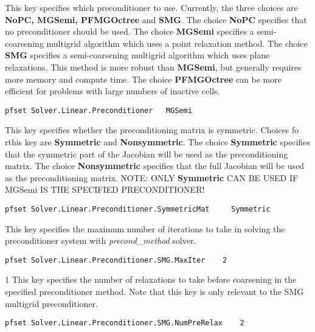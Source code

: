 {This key specifies which preconditioner to use.  Currently, the three choices
are {\bf NoPC, MGSemi, PFMGOctree} and {\bf SMG}.  The choice {\bf NoPC} specifies that no
preconditioner should be used.  The choice {\bf MGSemi} specifies 
a semi-coarsening multigrid algorithm which uses a point relaxation method. 
The choice {\bf SMG} specifies a semi-coarsening multigrid algorithm which uses
plane relaxations.  This method is more robust than {\bf MGSemi}, but generally
requires more memory and compute time. The choice {\bf PFMGOctree} can be more efficient for problems with large numbers of inactive cells.
}
\begin{display}\begin{verbatim}
pfset Solver.Linear.Preconditioner   MGSemi
\end{verbatim}\end{display}


{This key specifies whether the preconditioning matrix is symmetric.
Choices fo rthis key are {\bf Symmetric} and {\bf Nonsymmetric}.
The choice {\bf Symmetric} specifies that the symmetric part of the Jacobian
will be used as the preconditioning matrix.  The choice {\bf Nonsymmetric}
specifies that the full Jacobian will be used as the preconditioning matrix.
NOTE: ONLY {\bf Symmetric} CAN BE USED IF MGSemi IS THE SPECIFIED
PRECONDITIONER! 
}
\begin{display}\begin{verbatim}
pfset Solver.Linear.Preconditioner.SymmetricMat     Symmetric
\end{verbatim}\end{display}

{This key specifies the maximum number of iterations to take in solving the 
preconditioner system with {\em precond\_method} solver.
}
\begin{display}\begin{verbatim}
pfset Solver.Linear.Preconditioner.SMG.MaxIter    2
\end{verbatim}\end{display}

{1}
{This key specifies the number of relaxations to take before coarsening in the
specified preconditioner method.  Note that this key is only relevant to
the SMG multigrid preconditioner.
}
\begin{display}\begin{verbatim}
pfset Solver.Linear.Preconditioner.SMG.NumPreRelax    2
\end{verbatim}\end{display}


